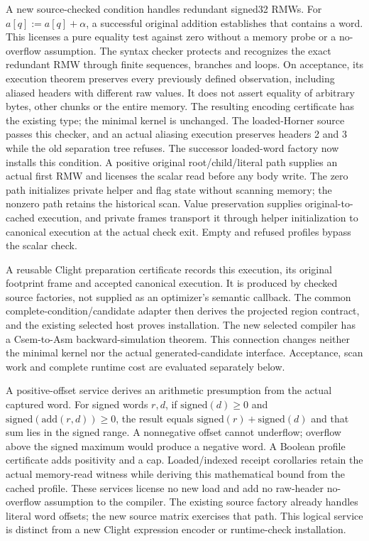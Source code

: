 A new source-checked condition handles redundant signed32 RMWs. For
$a[q] \mathrel{:=} a[q]+\alpha$, a successful original addition establishes
that  contains a word. This licenses a pure equality test against
zero without a memory probe or a no-overflow assumption. The syntax checker
protects  and recognizes the exact redundant RMW through finite
sequences, branches and loops. On acceptance, its execution theorem preserves
every previously defined  observation, including aliased headers
with different raw values. It does not assert equality of arbitrary bytes,
other chunks or the entire memory. The resulting encoding certificate has
the existing  type; the minimal kernel is unchanged.
The loaded-Horner source passes this checker, and an actual aliasing execution
preserves headers 2 and 3 while the old separation tree refuses. The successor loaded-word factory now installs this condition. A positive
original root/child/literal path supplies an actual first RMW and licenses the
scalar read before any body write. The zero path initializes private helper and
flag state without scanning memory; the nonzero path retains the historical
scan. Value preservation supplies original-to-cached execution, and private
frames transport it through helper initialization to canonical execution at the
actual check exit. Empty and refused profiles bypass the scalar check.

A reusable Clight preparation certificate records this execution, its original
footprint frame and accepted canonical execution. It is produced by checked
source factories, not supplied as an optimizer's semantic callback. The common
complete-condition/candidate adapter then derives the projected region
contract, and the existing selected host proves installation. The new selected
compiler has a Csem-to-Asm backward-simulation theorem. This connection changes
neither the minimal kernel nor the actual generated-candidate interface.
Acceptance, scan work and complete runtime cost are evaluated separately below.

A positive-offset service derives an arithmetic presumption from the actual
captured word. For signed words $r,d$, if $\mathrm{signed}(d)\geq0$ and
$\mathrm{signed}(\mathrm{add}(r,d))\geq0$, the result equals
$\mathrm{signed}(r)+\mathrm{signed}(d)$ and that sum lies in the signed range.
A nonnegative offset cannot underflow; overflow above the signed maximum would
produce a negative word. A Boolean profile certificate adds positivity and a
cap. Loaded/indexed receipt corollaries retain the actual memory-read witness
while deriving this mathematical bound from the cached profile. These services
license no new load and add no raw-header no-overflow assumption to the
compiler. The existing source factory already handles literal word offsets;
the new  source matrix exercises that path. This logical service is
distinct from a new Clight expression encoder or runtime-check installation.

